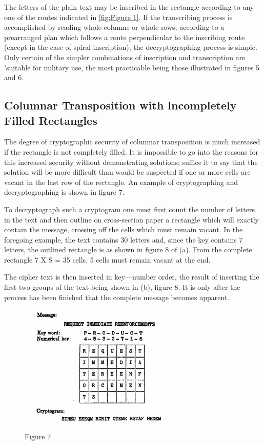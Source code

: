 \mypara The letters of the plain text may be inscribed in the rectangle
according to any one of the routes indicated in \ref{fig:Figure 1}. If the transcribing process is accomplished by reading whole columns or whole
rows, according to a prearranged plan which follows a route perpendicular to the inscribing route (except in the case of spiral inscription), the
decryptographing process is simple. Only certain of the simpler combinations of inscription and transcription are 'suitable for military use, the
most practicable being those illustrated in figures 5 and 6.

\subsection{Columnar Transposition with lncompletely Filled Rectangles}

\mypara The degree of cryptographic security of columnar transposition is
much increased if the rectangle is not completely filled. It is impossible
to go into the reasons for this increased security without demonstrating
solutions; suffice it to say that the solution will be more difficult than
would be suspected if one or more cells are vacant in the last row of the
rectangle. An example of cryptographing and decryptographing is shown
in figure 7.

\mypara To decryptograph such a cryptogram one must first count the
number of letters in the text and then outline on cross-section paper a
rectangle which will exactly contain the message, crossing off the cells
which must remain vacant. In the foregoing example, the text contains
30 letters and, since the key contains 7 letters, the outlined rectangle is as
shown in figure 8 of (a). From the complete rectangle 7 X S = 35 cells,
5 cells must remain vacant at the end.

\mypara The cipher text is then inserted in key—number order, the result of
inserting the first two groups of the text being shown in (b), figure 8.
It is only after the process has been finished that the complete message
becomes apparent.

\begin{figure}[h]
  \centering
    \includegraphics[width=0.7\textwidth,natwidth=429,natheight=317]{Chapter2_Figure7.png}
    \label{fig:Figure 7}
    \caption{Figure 7}
\end{figure}

